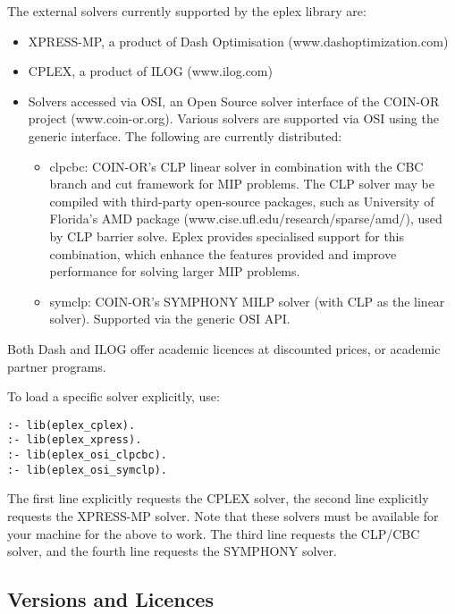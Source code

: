 The external solvers currently supported by the eplex library are:
\begin{itemize}
\item XPRESS-MP, a product of Dash Optimisation (www.dashoptimization.com)
\item CPLEX, a product of ILOG (www.ilog.com)
\item Solvers accessed via OSI, an Open Source solver interface of the
COIN-OR project (www.coin-or.org). Various solvers are supported via OSI
using the generic interface. The following are currently distributed:
\begin{itemize}
\item clpcbc: COIN-OR's CLP linear solver in combination with the CBC
branch and cut framework for MIP problems. The CLP solver may be compiled
with third-party open-source packages, such as University of Florida's 
AMD package (www.cise.ufl.edu/research/sparse/amd/), used by CLP barrier
solve. Eplex provides specialised
support for this combination, which enhance the features provided and
improve performance for solving larger MIP problems. 
\item symclp: COIN-OR's SYMPHONY MILP solver (with CLP as the linear
solver). Supported via the generic OSI API.
\end{itemize}
\end{itemize}
Both Dash and ILOG offer academic licences at discounted prices, or academic
partner programs.

To load a specific solver explicitly, use:

\begin{verbatim}
:- lib(eplex_cplex).
:- lib(eplex_xpress).
:- lib(eplex_osi_clpcbc). 
:- lib(eplex_osi_symclp). 
\end{verbatim}
The first line explicitly requests the CPLEX solver, the second line
explicitly requests the XPRESS-MP solver. Note that these solvers must be
available for your machine for the above to work. The third line requests
the CLP/CBC solver, and the fourth line requests the SYMPHONY solver.


\subsection{Versions and Licences}

